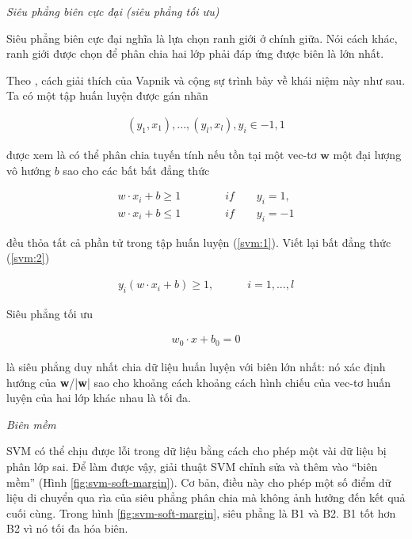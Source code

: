 \textit{Siêu phẳng biên cực đại (siêu phẳng tối ưu)}

Siêu phẳng biên cực đại nghĩa là lựa chọn ranh giới ở chính giữa. Nói cách khác, ranh giới được chọn để phân chia hai lớp phải đáp ứng được biên là lớn nhất.

Theo \cite{68-Vapnik}, cách giải thích của Vapnik và cộng sự trình bày về khái niệm này như sau. Ta có một tập huấn luyện được gán nhãn

\begin{gather}
	\label{svm:1}
	(y_1, x_1), ... , (y_l, x_l), y_i \in {-1, 1}
\end{gather}

được xem là có thể phân chia tuyến tính nếu tồn tại một vec-tơ \( \textbf{w} \) một đại lượng vô hướng \( \textit{b}\) sao cho các bất bất đẳng thức

\begin{equation}
	\begin{gathered}
	\label{svm:2}
		w \cdot x_i + \textit{b} \geq 1 \quad \quad \quad \quad if \quad \quad y_i = 1, \\
		w \cdot x_i + \textit{b} \leq 1 \quad \quad \quad \quad if \quad \quad y_i = -1
	\end{gathered}
\end{equation}

đều thỏa tất cả phần tử trong tập huấn luyện (\ref{svm:1}). Viết lại bất đẳng thức (\ref{svm:2})

\begin{gather}
	\label{svm:3}
	y_i (w \cdot x_i + \textit{b}) \geq 1, \quad \quad \quad i = 1, ..., l
\end{gather}

Siêu phẳng tối ưu

\begin{gather}
	\label{svm:4}
	w_0 \cdot x + \textit{b}_0 = 0
\end{gather}

là siêu phẳng duy nhất chia dữ liệu huấn luyện với biên lớn nhất: nó xác định hướng của \textbf{w}/|\textbf{w}| sao cho khoảng cách khoảng cách hình chiếu của vec-tơ huấn luyện của hai lớp khác nhau là tối đa.

\textit{Biên mềm}

SVM có thể chịu được lỗi trong dữ liệu bằng cách cho phép một vài dữ liệu bị phân lớp sai. Để làm được vậy, giải thuật SVM chỉnh sửa và thêm vào “biên mềm” (Hình \ref{fig:svm-soft-margin}). Cơ bản, điều này cho phép một số điểm dữ liệu di chuyển qua rìa của siêu phẳng phân chia mà không ảnh hưởng đến kết quả cuối cùng. Trong hình \ref{fig:svm-soft-margin}, siêu phẳng là B1 và B2. B1 tốt hơn B2 vì nó tối đa hóa biên. 

